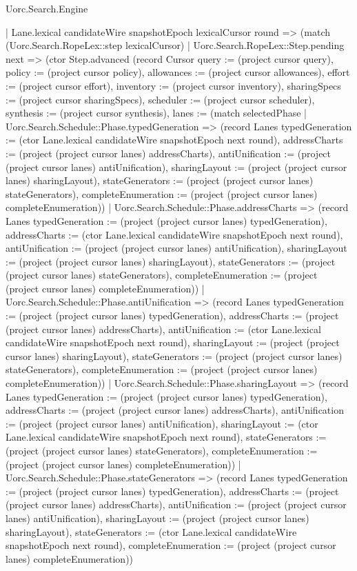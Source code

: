 \begin{lexlean}{Uorc.Search.Engine}
\begin{semanticmodule}
{    | Lane.lexical candidateWire snapshotEpoch lexicalCursor round => (match (Uorc.Search.RopeLex::step lexicalCursor)
      | Uorc.Search.RopeLex::Step.pending next => (ctor Step.advanced (record Cursor {query := (project cursor query), policy := (project cursor policy), allowances := (project cursor allowances), effort := (project cursor effort), inventory := (project cursor inventory), sharingSpecs := (project cursor sharingSpecs), scheduler := (project cursor scheduler), synthesis := (project cursor synthesis), lanes := (match selectedPhase
        | Uorc.Search.Schedule::Phase.typedGeneration => (record Lanes {typedGeneration := (ctor Lane.lexical candidateWire snapshotEpoch next round), addressCharts := (project (project cursor lanes) addressCharts), antiUnification := (project (project cursor lanes) antiUnification), sharingLayout := (project (project cursor lanes) sharingLayout), stateGenerators := (project (project cursor lanes) stateGenerators), completeEnumeration := (project (project cursor lanes) completeEnumeration)})
        | Uorc.Search.Schedule::Phase.addressCharts => (record Lanes {typedGeneration := (project (project cursor lanes) typedGeneration), addressCharts := (ctor Lane.lexical candidateWire snapshotEpoch next round), antiUnification := (project (project cursor lanes) antiUnification), sharingLayout := (project (project cursor lanes) sharingLayout), stateGenerators := (project (project cursor lanes) stateGenerators), completeEnumeration := (project (project cursor lanes) completeEnumeration)})
        | Uorc.Search.Schedule::Phase.antiUnification => (record Lanes {typedGeneration := (project (project cursor lanes) typedGeneration), addressCharts := (project (project cursor lanes) addressCharts), antiUnification := (ctor Lane.lexical candidateWire snapshotEpoch next round), sharingLayout := (project (project cursor lanes) sharingLayout), stateGenerators := (project (project cursor lanes) stateGenerators), completeEnumeration := (project (project cursor lanes) completeEnumeration)})
        | Uorc.Search.Schedule::Phase.sharingLayout => (record Lanes {typedGeneration := (project (project cursor lanes) typedGeneration), addressCharts := (project (project cursor lanes) addressCharts), antiUnification := (project (project cursor lanes) antiUnification), sharingLayout := (ctor Lane.lexical candidateWire snapshotEpoch next round), stateGenerators := (project (project cursor lanes) stateGenerators), completeEnumeration := (project (project cursor lanes) completeEnumeration)})
        | Uorc.Search.Schedule::Phase.stateGenerators => (record Lanes {typedGeneration := (project (project cursor lanes) typedGeneration), addressCharts := (project (project cursor lanes) addressCharts), antiUnification := (project (project cursor lanes) antiUnification), sharingLayout := (project (project cursor lanes) sharingLayout), stateGenerators := (ctor Lane.lexical candidateWire snapshotEpoch next round), completeEnumeration := (project (project cursor lanes) completeEnumeration)})
}}
\end{semanticmodule}
\end{lexlean}
